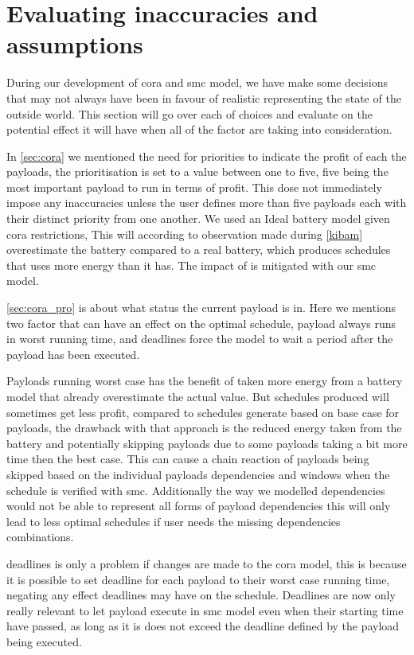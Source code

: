 \section{Evaluating inaccuracies and assumptions}
During our development of \gls{cora} and \gls{smc} model, we have make some decisions that may not always have been in favour of realistic representing the state of the outside world. This section will go over each of choices and evaluate on the potential effect it will have when all of the factor are taking into consideration.

In \cref{sec:cora} we mentioned the need for priorities to indicate the profit of each the payloads, the prioritisation is set to a value between one to five, five being the most important payload to run in terms of profit. This dose not immediately impose any inaccuracies unless the user defines more than five payloads each with their distinct priority from one another.
We used an Ideal battery model given \gls{cora} restrictions, This will according to observation made during \cref{kibam} overestimate the battery compared to a real battery, which produces schedules that uses more energy than it has. The impact of is mitigated with our \gls{smc} model.

\cref{sec:cora_pro} is about what status the current payload is in. Here we mentions two factor that can have an effect on the optimal schedule, payload always runs in worst running time, and deadlines force the model to wait a period after the payload has been executed. 

Payloads running worst case has the benefit of taken more energy from a battery model that already overestimate the actual value. But schedules produced will sometimes get less profit, compared to schedules generate based on base case for payloads, the drawback with that approach is the reduced energy taken from the battery and potentially skipping payloads due to some payloads taking a bit more time then the best case. This can cause a chain reaction of payloads being skipped based on the individual payloads dependencies and windows when the schedule is verified with \gls{smc}. Additionally the way we modelled dependencies would not be able to represent all forms of payload dependencies this will only lead to less optimal schedules if user needs the missing dependencies combinations.

deadlines is only a problem if changes are made to the \gls{cora} model, this is because it is possible to set deadline for each payload to their worst case running time, negating any effect deadlines may have on the schedule. Deadlines are now only really relevant to let payload execute in \gls{smc} model even when their starting time have passed, as long as it is does not exceed the deadline defined by the payload being executed.

